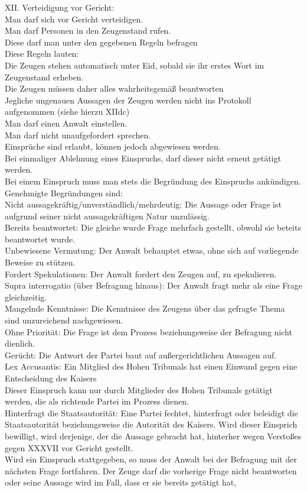 \documentclass{article}
\begin{document}
XII. Verteidigung vor Gericht:\\Man darf sich vor Gericht verteidigen.\\Man darf Personen in den Zeugenstand rufen.\\Diese darf man unter den gegebenen Regeln befragen\\Diese Regeln lauten:\\Die Zeugen stehen automatisch unter Eid, sobald sie ihr erstes Wort im Zeugenstand erheben.\\Die Zeugen müssen daher alles wahrheitsgemäß beantworten\\Jegliche ungenauen Aussagen der Zeugen werden nicht ins Protokoll aufgenommen (siehe hierzu XIIdc)\\Man darf einen Anwalt einstellen.\\Man darf nicht unaufgefordert sprechen.\\Einsprüche sind erlaubt, können jedoch abgewiesen werden.\\Bei einmaliger Ablehnung eines Einspruchs, darf dieser nicht erneut getätigt werden.\\Bei einem Einspruch muss man stets die Begründung des Einspruchs ankündigen.\\Genehmigte Begründungen sind:\\Nicht aussagekräftig/unverständlich/mehrdeutig: Die Aussage oder Frage ist aufgrund seiner nicht aussagekräftigen Natur unzulässig.\\Bereits beantwortet: Die gleiche wurde  Frage mehrfach gestellt, obwohl sie beteits beantwortet wurde.\\Unbewiesene Vermutung: Der Anwalt behauptet etwas, ohne sich auf vorliegende Beweise zu stützen.\\Fordert Spekulationen: Der Anwalt fordert den Zeugen auf, zu spekulieren.\\Supra interrogatio (über Befragung hinaus): Der Anwalt fragt mehr als eine Frage gleichzeitig.\\Mangelnde Kenntnisse: Die Kenntnisse des Zeugens über das gefragte Thema sind unzureichend nachgewiesen.\\Ohne Priorität: Die Frage ist dem Prozess beziehungsweise der Befragung nicht dienlich.\\Gerücht: Die Antwort der Partei baut auf außergerichtlichen Aussagen auf.\\Lex Accusantis: Ein Mitglied des Hohen Tribunals hat einen Einwand gegen eine Entscheidung des Kaisers\\Dieser Einspruch kann nur durch Mitglieder des Hohen Tribunals getätigt werden, die als richtende Partei im Prozess dienen.\\Hinterfragt die Staatsautorität: Eine Partei fechtet, hinterfragt oder beleidigt die Staatsautorität beziehungsweise die Autorität des Kaisers. Wird dieser Einsprich bewilligt, wird derjenige, der die Aussage gebracht hat, hinterher wegen Verstoßes gegen XXXVII vor Gericht gestellt.\\Wird ein Einspruch stattgegeben, so muss der Anwalt bei der Befragung mit der nächsten Frage fortfahren. Der Zeuge darf die vorherige Frage nicht beantworten oder seine Aussage wird im Fall, dass er sie bereits getätigt hat, 
\end{document}
